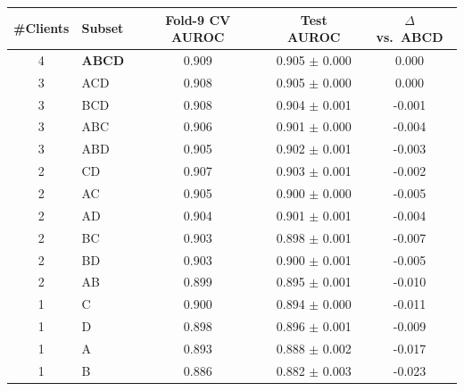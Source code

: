 \begin{tabular}{@{}clccc@{}}
\toprule
\#Clients & Subset & Fold-9 CV AUROC & Test AUROC & $\Delta$ vs.\ ABCD \\
\midrule
4 & \textbf{ABCD} & 0.909 & 0.905 $\pm$ 0.000 & 0.000 \\
\midrule
3 & ACD & 0.908 & 0.905 $\pm$ 0.000 & 0.000 \\
3 & BCD & 0.908 & 0.904 $\pm$ 0.001 & -0.001 \\
3 & ABC & 0.906 & 0.901 $\pm$ 0.000 & -0.004 \\
3 & ABD & 0.905 & 0.902 $\pm$ 0.001 & -0.003 \\
\midrule
2 & CD & 0.907 & 0.903 $\pm$ 0.001 & -0.002 \\
2 & AC & 0.905 & 0.900 $\pm$ 0.000 & -0.005 \\
2 & AD & 0.904 & 0.901 $\pm$ 0.001 & -0.004 \\
2 & BC & 0.903 & 0.898 $\pm$ 0.001 & -0.007 \\
2 & BD & 0.903 & 0.900 $\pm$ 0.001 & -0.005 \\
2 & AB & 0.899 & 0.895 $\pm$ 0.001 & -0.010 \\
\midrule
1 & C & 0.900 & 0.894 $\pm$ 0.000 & -0.011 \\
1 & D & 0.898 & 0.896 $\pm$ 0.001 & -0.009 \\
1 & A & 0.893 & 0.888 $\pm$ 0.002 & -0.017 \\
1 & B & 0.886 & 0.882 $\pm$ 0.003 & -0.023 \\
\bottomrule
\end{tabular}
